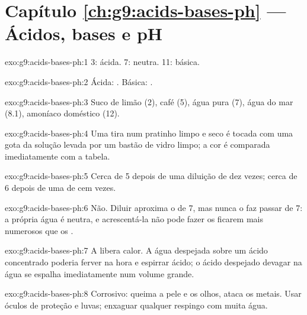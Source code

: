 \section*{Capítulo \ref{ch:g9:acids-bases-ph} --- Ácidos, bases e pH}

\begin{solution}{exo:g9:acids-bases-ph:1}
 3: ácida.  7: neutra.  11: básica.
\end{solution}

\begin{solution}{exo:g9:acids-bases-ph:2}
Ácida:  . Básica:  .
\end{solution}

\begin{solution}{exo:g9:acids-bases-ph:3}
Suco de limão (2), café (5), água pura (7), água do mar (8.1), amoníaco
doméstico (12).
\end{solution}

\begin{solution}{exo:g9:acids-bases-ph:4}
Uma tira num pratinho limpo e seco é tocada com uma gota da solução
levada por um bastão de vidro limpo; a cor é comparada imediatamente com
a tabela.
\end{solution}

\begin{solution}{exo:g9:acids-bases-ph:5}
Cerca de 5 depois de uma diluição de dez vezes; cerca de 6 depois de uma de cem vezes.
\end{solution}

\begin{solution}{exo:g9:acids-bases-ph:6}
Não. Diluir aproxima o  de 7, mas nunca o faz passar de 7: a própria
água é neutra, e acrescentá-la não pode fazer os   ficarem
mais numerosos que os  .
\end{solution}

\begin{solution}{exo:g9:acids-bases-ph:7}
A  libera calor. A água despejada sobre um ácido concentrado
poderia ferver na hora e espirrar ácido; o ácido despejado devagar na
água se espalha imediatamente num volume grande.
\end{solution}

\begin{solution}{exo:g9:acids-bases-ph:8}
Corrosivo: queima a pele e os olhos, ataca os metais. Usar óculos de
proteção e luvas; enxaguar qualquer respingo com muita água.
\end{solution}

